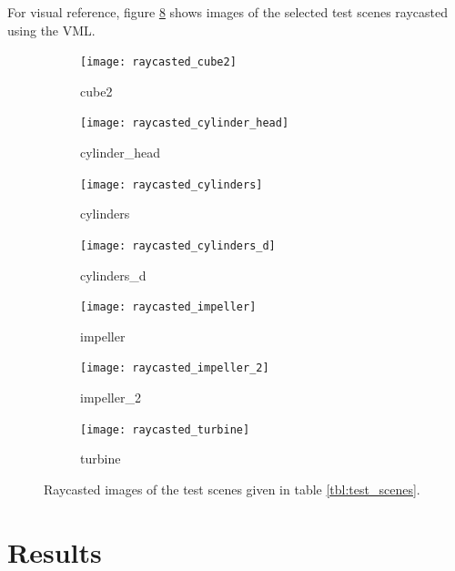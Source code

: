 For visual reference, figure \ref{fig:raycasted_scenes} shows images of the selected test scenes raycasted using the VML.
%
\begin{figure}[!]
	\centering
	\begin{subfigure}[b]{0.43\textwidth}
		\centering
		\texttt{[image: raycasted\_cube2]}
		\caption{cube2}
		\label{fig:cube2_raycasted}
	\end{subfigure}
	\begin{subfigure}[b]{0.43\textwidth}
		\centering
		\texttt{[image: raycasted\_cylinder\_head]}
		\caption{cylinder\_head}
		\label{fig:cylinder_head_raycasted}
	\end{subfigure}
	\begin{subfigure}[b]{0.43\textwidth}
		\centering
		\texttt{[image: raycasted\_cylinders]}
		\caption{cylinders}
		\label{fig:cylinders_raycasted}
	\end{subfigure}
	\begin{subfigure}[b]{0.43\textwidth}
		\centering
		\texttt{[image: raycasted\_cylinders\_d]}
		\caption{cylinders\_d}
		\label{fig:cylinders_d_raycasted}
	\end{subfigure}
	\begin{subfigure}[b]{0.43\textwidth}
		\centering
		\texttt{[image: raycasted\_impeller]}
		\caption{impeller}
		\label{fig:impeller_raycasted}
	\end{subfigure}
	\begin{subfigure}[b]{0.43\textwidth}
		\centering
		\texttt{[image: raycasted\_impeller\_2]}
		\caption{impeller\_2}
		\label{fig:impeller_2_raycasted}
	\end{subfigure}
	\begin{subfigure}[b]{0.43\textwidth}
		\centering
		\texttt{[image: raycasted\_turbine]}
		\caption{turbine}
		\label{fig:turbine_raycasted}
	\end{subfigure}
	\caption{
		Raycasted images of the test scenes given in table \ref{tbl:test_scenes}.
	}
	\label{fig:raycasted_scenes}
\end{figure}

\section{Results}
\label{sec:direct_intersection_results}

